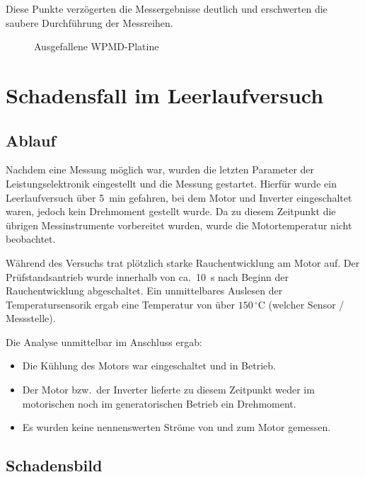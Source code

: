 Diese Punkte verzögerten die Messergebnisse deutlich und erschwerten die saubere Durchführung der Messreihen.

\begin{figure}[htbp]
    \centering
    \caption{Ausgefallene WPMD-Platine}
    \label{fig:wpmd_defekt}
\end{figure}

 
\section{Schadensfall im Leerlaufversuch}
\label{sec:schadensfall}
 

\subsection{Ablauf}
\label{subsec:schadensablauf}

Nachdem eine Messung möglich war, wurden die letzten Parameter der Leistungselektronik eingestellt und die Messung gestartet. Hierfür wurde ein Leerlaufversuch über \SI{5}{min} gefahren, bei dem Motor und Inverter eingeschaltet waren, jedoch kein Drehmoment gestellt wurde. Da zu diesem Zeitpunkt die übrigen Messinstrumente vorbereitet wurden, wurde die Motortemperatur nicht beobachtet.

Während des Versuchs trat plötzlich starke Rauchentwicklung am Motor auf. Der Prüfstandsantrieb wurde innerhalb von ca.\ \SI{10}{s} nach Beginn der Rauchentwicklung abgeschaltet. %
Ein unmittelbares Auslesen der Temperatursensorik ergab eine Temperatur von über $150\,^\circ\mathrm{C}$ (welcher Sensor / Messstelle).

Die Analyse unmittelbar im Anschluss ergab:
\begin{itemize}
    \item Die Kühlung des Motors war eingeschaltet und in Betrieb.
    \item Der Motor bzw.\ der Inverter lieferte zu diesem Zeitpunkt weder im motorischen noch im generatorischen Betrieb ein Drehmoment.
    \item Es wurden keine nennenswerten Ströme von und zum Motor gemessen.
\end{itemize}

\subsection{Schadensbild}
\label{subsec:schadensbild}

